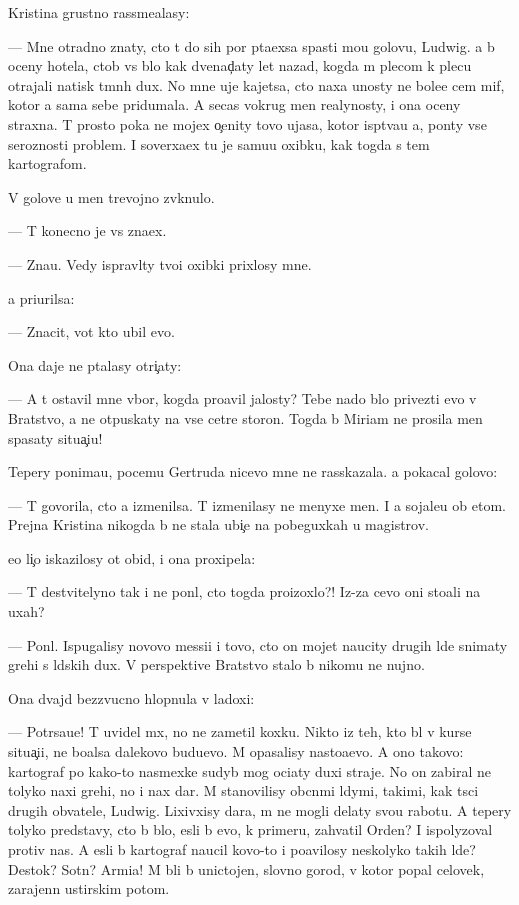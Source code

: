 \documentclass[10pt]{book}
\begin{document}
Kristina grustno rassme{\y}alasy:

— Mne otradno znaty, cto t{\yi} do sih por p{\yi}ta{\y}exsa spasti mo{\y}u golovu, Ludwig. {\Y}a b{\yi} oceny hotela, ctob{\yi} vs{\e} b{\yi}lo kak dvenad{\c}aty let nazad, kogda m{\yi} plecom k plecu otrajali natisk t{\e}mn{\yi}h dux. No mne uje kajetsa, cto naxa {\y}unosty ne bole{\y}e cem mif, kotor{\yi}{\y} {\y}a sama sebe pridumala. A se{\y}cas vokrug men{\ia} realynosty, i ona oceny straxna. T{\yi} prosto poka ne mojex o{\c}enity tovo ujasa, kotor{\yi}{\y} isp{\yi}t{\yi}va{\y}u {\y}a, pon{\ia}ty vse{\y} ser{\y}oznosti problem{\yi}. I soverxa{\y}ex tu je samu{\y}u oxibku, kak togda s tem kartografom.

V golove u men{\ia} trevojno zv{\ia}knulo.

— T{\yi} konecno je vs{\e} zna{\y}ex.

— Zna{\y}u. Vedy ispravl{\ia}ty tvo{\y}i oxibki prixlosy mne.

{\Y}a pri{\x}urilsa:

— Znacit, vot kto ubil {\y}evo.

Ona daje ne p{\yi}talasy otri{\c}aty:

— A t{\yi} ostavil mne v{\yi}bor, kogda pro{\y}avil jalosty? Tebe nado b{\yi}lo privezti {\y}evo v Bratstvo, a ne otpuskaty na vse cet{\yi}re storon{\yi}. Togda b{\yi} Miriam ne prosila men{\ia} spasaty situa{\c}i{\y}u!

Tepery ponima{\y}u, pocemu Gertruda nicevo mne ne rasskazala. {\Y}a pokacal golovo{\y}:

— T{\yi} govorila, cto {\y}a izmenilsa. T{\yi} izmenilasy ne menyxe men{\ia}. I {\y}a sojale{\y}u ob etom. Prejn{\ia}{\y}a Kristina nikogda b{\yi} ne stala ubi{\y}{\c}e{\y} na pobeguxkah u magistrov.

{\Y}e{\y}o li{\c}o iskazilosy ot obid{\yi}, i ona proxipela:

— T{\yi} de{\y}stvitelyno tak i ne pon{\ia}l, cto togda proizoxlo?! Iz-za cevo oni sto{\y}ali na uxah?

— Pon{\ia}l. Ispugalisy novovo messi{\y}i i tovo, cto on mojet naucity drugih l{\iu}de{\y} snimaty grehi s l{\iu}dskih dux. V perspektive Bratstvo stalo b{\yi} nikomu ne nujno.

Ona dvajd{\yi} bezzvucno hlopnula v ladoxi:

— Potr{\ia}sa{\y}u{\x}e! T{\yi} uvidel m{\yi}x, no ne zametil koxku. Nikto iz teh, kto b{\yi}l v kurse situa{\c}i{\y}i, ne bo{\y}alsa dalekovo budu{\x}evo. M{\yi} opasalisy nasto{\y}a{\x}evo. A ono takovo: kartograf po kako{\y}-to nasmexke sudyb{\yi} mog oci{\x}aty duxi straje{\y}. No on zabiral ne tolyko naxi grehi, no i nax dar. M{\yi} stanovilisy ob{\yi}cn{\yi}mi l{\iu}dymi, takimi, kak t{\yi}s{\ia}ci drugih ob{\yi}vatele{\y}, Ludwig. Lixivxisy dara, m{\yi} ne mogli delaty svo{\y}u rabotu. A tepery tolyko predstavy, cto b{\yi} b{\yi}lo, {\y}esli b{\yi} {\y}evo, k primeru, zahvatil Orden? I ispolyzoval protiv nas. A {\y}esli b{\yi} kartograf naucil kovo-to i po{\y}avilosy neskolyko takih l{\iu}de{\y}? Des{\ia}tok? Sotn{\ia}? Armi{\y}a! M{\yi} b{\yi}li b{\yi} unictojen{\yi}, slovno gorod, v kotor{\yi}{\y} popal celovek, zarajenn{\yi}{\y} {\y}ustirskim potom.
\end{document}
